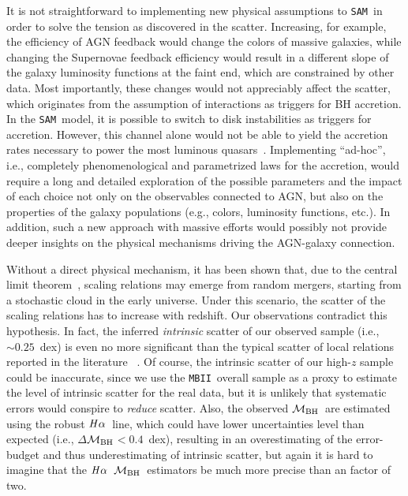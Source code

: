 \documentclass[twocolumn,trackchanges]{aastex63}
\newcommand{\mbh}{$\mathcal M_{\rm BH}$}
\newcommand{\halpha}{${\it H}\alpha$}
\newcommand{\sam}{\texttt{SAM}}
\newcommand{\mbii}{\texttt{MBII}}
\begin{document}
It is not straightforward to implementing new physical assumptions to \sam\  in order to solve the tension as discovered in the scatter. 
Increasing, for example, the efficiency of AGN feedback would change the colors of massive galaxies, while changing the Supernovae feedback efficiency would result in a different slope of the galaxy luminosity functions at the faint end, which are constrained by other data. Most importantly, these changes would not appreciably affect the scatter, which originates from the assumption of interactions as triggers for BH accretion. In the \sam\ model, it is possible to switch to disk instabilities as triggers for accretion. However, this channel alone would not be able to yield the accretion rates necessary to power the most luminous quasars~\citep[see][]{Menci2014}. Implementing ``ad-hoc'', i.e., completely phenomenological and parametrized laws for the accretion, would require a long and detailed exploration of the possible parameters and the impact of each choice not only on the observables connected to AGN, but also on the properties of the galaxy populations (e.g., colors, luminosity functions, etc.). In addition, such a new approach with massive efforts would possibly not provide deeper insights on the physical mechanisms driving the AGN-galaxy connection.


Without a direct physical mechanism, it has been shown that, due to the central limit theorem~\citep{Peng2007, Jahnke2011, Hirschmann2010}, scaling relations may emerge from random mergers, starting from a stochastic cloud in the early universe. Under this scenario, the scatter of the scaling relations has to increase with redshift. Our observations contradict this hypothesis. In fact, the inferred {\it intrinsic} scatter of our observed sample (i.e., $\sim0.25$~dex) is even no more significant than the typical scatter of local relations reported in the literature ~\citep[][i.e., $\gtrsim0.35$~dex]{Kormendy13, Gul++09, Reines2015}. Of course, the intrinsic scatter of our high-$z$ sample could be inaccurate, since we use the \mbii\ overall sample as a proxy to estimate the level of intrinsic scatter for the real data, but it is unlikely that systematic errors would conspire to {\it reduce} scatter.
Also, the observed \mbh\ are estimated using the robust \halpha\ line, which could have lower uncertainties level than expected (i.e., $\Delta$\mbh$<0.4$~dex), resulting in an overestimating of the error-budget and thus underestimating of intrinsic scatter, but again it is hard to imagine that the \halpha\ \mbh\ estimators be much more precise than an factor of two.
\end{document}
